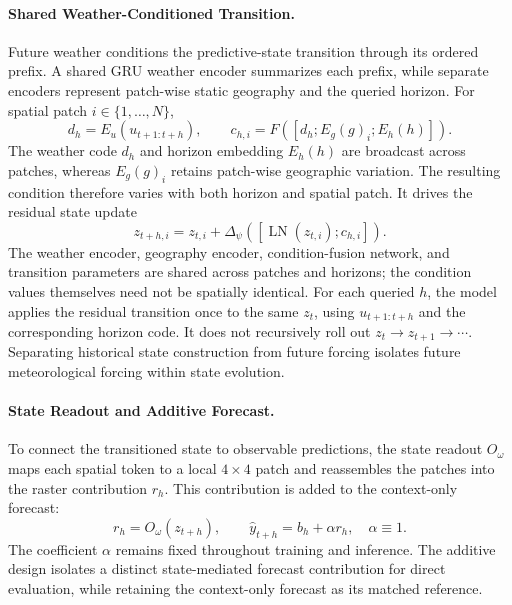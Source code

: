 \documentclass[letterpaper]{article} %
\begin{document}
\paragraph{Shared Weather-Conditioned Transition.}
Future weather conditions the predictive-state transition through its ordered
prefix. A shared GRU weather encoder summarizes each prefix, while separate
encoders represent patch-wise static geography and the queried horizon. For
spatial patch $i\in\{1,\ldots,N\}$,
\begin{equation}
d_h=E_u(u_{t+1:t+h}),\qquad
c_{h,i}=F\!\left([d_h;E_g(g)_i;E_h(h)]\right).
\label{eq:condition}
\end{equation}
The weather code $d_h$ and horizon embedding $E_h(h)$ are broadcast across
patches, whereas $E_g(g)_i$ retains patch-wise geographic variation. The
resulting condition therefore varies with both horizon and spatial patch.
It drives the residual state update
\begin{equation}
z_{t+h,i}
=z_{t,i}+\Delta_\psi\!\left(
[\operatorname{LN}(z_{t,i});c_{h,i}]\right).
\label{eq:transition}
\end{equation}
The weather encoder, geography encoder, condition-fusion network, and
transition parameters are shared across patches and horizons; the condition
values themselves need not be spatially identical. For each queried $h$, the
model applies the residual transition once to the same $z_t$, using
$u_{t+1:t+h}$ and the corresponding horizon code. It does not recursively
roll out $z_t\!\to z_{t+1}\!\to\cdots$. Separating historical state
construction from future forcing isolates future meteorological forcing within
state evolution.

\paragraph{State Readout and Additive Forecast.}
To connect the transitioned state to observable predictions, the state
readout $O_\omega$ maps each spatial token to a local $4\times4$ patch and
reassembles the patches into the raster contribution $r_h$. This contribution
is added to the context-only forecast:
\begin{equation}
r_h=O_\omega(z_{t+h}),\qquad
\widehat y_{t+h}=b_h+\alpha r_h,\quad \alpha\equiv1.
\label{eq:closure}
\end{equation}
The coefficient $\alpha$ remains fixed throughout training and inference.
The additive design isolates a distinct state-mediated forecast contribution
for direct evaluation, while retaining the context-only forecast as its
matched reference.
\end{document}
